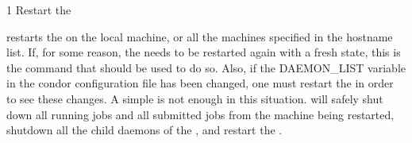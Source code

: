 \begin{ManPage}{\label{man-condor-restart}}{1}
{Restart the }
\Synopsis {}


\Description 

 restarts the  on the local machine, or all the
machines specified in the hostname list.  If, for some reason, the
 needs to be restarted again with a fresh state, this is the
command that should be used to do so.  Also, if the DAEMON\_LIST variable in
the condor configuration file has been changed, one must restart the
 in order to see these changes.  A simple 
is not enough in this situation.   will safely shut down
all running jobs and all submitted jobs from the machine being restarted,
shutdown all the child daemons of the , and restart the
.

\begin{Options}
\end{Options}

\end{ManPage}
